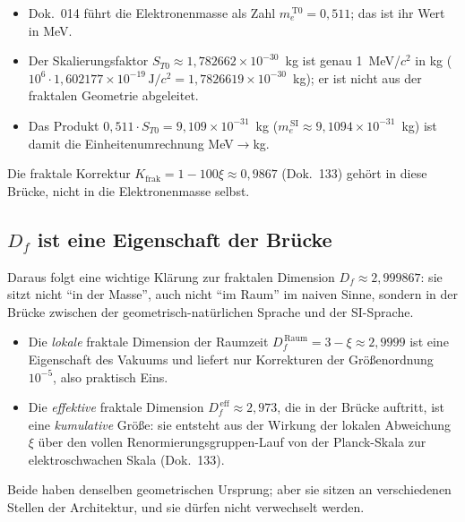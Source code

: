 \begin{itemize}\setlength\itemsep{0pt}
  \item Dok.~014 führt die Elektronenmasse als Zahl
        $m_{e}^{\,\mathrm{T0}} = 0{,}511$; das ist ihr Wert in MeV.
  \item Der Skalierungsfaktor $S_{T0} \approx 1{,}782662\times 10^{-30}$~kg
        ist genau 1~MeV/$c^2$ in kg
        ($10^6\cdot1{,}602177\times10^{-19}\,\text{J}/c^2 = 1{,}7826619\times10^{-30}$~kg);
        er ist nicht aus der fraktalen Geometrie abgeleitet.
  \item Das Produkt $0{,}511\cdot S_{T0} = 9{,}109\times10^{-31}$~kg
        ($m_{e}^{\,\mathrm{SI}} \approx 9{,}1094 \times 10^{-31}$~kg) ist
        damit die Einheitenumrechnung MeV$\to$kg.
\end{itemize}

Die fraktale Korrektur $K_{\mathrm{frak}} = 1 - 100\xi \approx 0{,}9867$
(Dok.~133) gehört in diese Brücke, nicht in die Elektronenmasse selbst.

\subsection{$D_f$ ist eine Eigenschaft der Brücke}

Daraus folgt eine wichtige Klärung zur fraktalen Dimension
$D_{f} \approx 2{,}999867$: sie sitzt nicht ``in der Masse'', auch nicht
``im Raum'' im naiven Sinne, sondern in der Brücke zwischen der
geometrisch-natürlichen Sprache und der SI-Sprache.

\begin{itemize}\setlength\itemsep{0pt}
  \item Die \emph{lokale} fraktale Dimension der Raumzeit
        $D_{f}^{\,\text{Raum}} = 3 - \xi \approx 2{,}9999$ ist eine
        Eigenschaft des Vakuums und liefert nur Korrekturen der
        Größenordnung $10^{-5}$, also praktisch Eins.
  \item Die \emph{effektive} fraktale Dimension
        $D_{f}^{\,\text{eff}} \approx 2{,}973$, die in der Brücke auftritt,
        ist eine \emph{kumulative} Größe: sie entsteht aus der Wirkung
        der lokalen Abweichung $\xi$ über den vollen
        Renormierungsgruppen-Lauf von der Planck-Skala zur elektroschwachen
        Skala (Dok.~133).
\end{itemize}

Beide haben denselben geometrischen Ursprung; aber sie sitzen an
verschiedenen Stellen der Architektur, und sie dürfen nicht verwechselt
werden.


